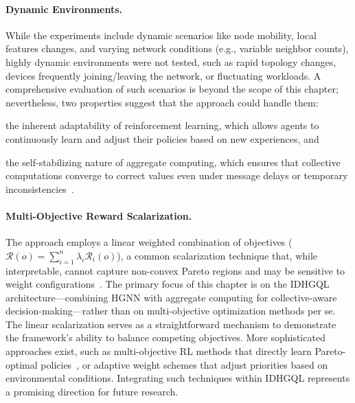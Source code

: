 \paragraph{Dynamic Environments.}
While the experiments include dynamic scenarios like node mobility,
local features changes,
and varying network conditions (e.g., variable neighbor counts),
highly dynamic environments were not tested, such as rapid topology changes,
devices frequently joining/leaving the network,
or fluctuating workloads.
%
A comprehensive evaluation of such scenarios is beyond the scope of this chapter;
nevertheless, two properties suggest that the approach could handle them:
\begin{enumerate*}[label=(\roman*)]
    \item the inherent adaptability of reinforcement learning, 
    which allows agents to continuously learn and adjust their policies based on new experiences, and
    \item the self-stabilizing nature of aggregate computing, 
    which ensures that collective computations converge to correct values even under message delays or temporary inconsistencies~\cite{DBLP:journals/tocl/AudritoVDPB19}.
\end{enumerate*}

\paragraph{Multi-Objective Reward Scalarization.}
The approach employs a linear weighted combination of objectives ($\mathcal{R}(o) = \sum_{i=1}^n \lambda_i \mathcal{R}_i(o)$),
a common scalarization technique that, while interpretable, 
 cannot capture non-convex Pareto regions and may be sensitive to weight configurations~\cite{Hayes2022}.
%
The primary focus of this chapter is on the IDHGQL architecture---combining \gls{HGNN} with aggregate computing for collective-aware decision-making---rather than 
 on multi-objective optimization methods per se.
The linear scalarization 
 serves as a straightforward mechanism to demonstrate the framework's ability to balance competing objectives.
%
More sophisticated approaches exist, 
 such as multi-objective RL methods that directly learn Pareto-optimal policies~\cite{navon2021learning}, 
  or adaptive weight schemes that adjust priorities based on environmental conditions.
Integrating such techniques within IDHGQL represents a promising direction for future research.


